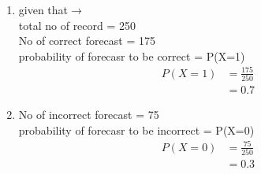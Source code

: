 \renewcommand{\theequation}{\theenumi}
\begin{enumerate}[label=\arabic*.,ref=\thesubsection.\theenumi]
\item given that$\to$
\\
total no of record = 250
\\
No of correct forecast = 175
\\
probability of forecasr to be correct = P(X=1)
\begin{align}
P\left(X=1\right) & = \frac{175}{250}
\\
&= 0.7
\end{align}
\item No of incorrect forecast = 75
\\
probability of forecasr to be incorrect = P(X=0)
\begin{align}
P\left(X=0\right) & = \frac{75}{250}
\\
&= 0.3
\end{align}
\end{enumerate}